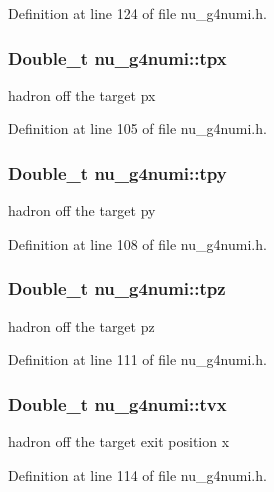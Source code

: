 Definition at line 124 of file nu\-\_\-g4numi.\-h.

\hypertarget{classnu__g4numi_a8693b10daf61759ad2decb2c3aac6a9e}{
\subsubsection[{tpx}]{\setlength{\rightskip}{0pt plus 5cm}Double\-\_\-t nu\-\_\-g4numi\-::tpx}}\label{classnu__g4numi_a8693b10daf61759ad2decb2c3aac6a9e}
hadron off the target px 

Definition at line 105 of file nu\-\_\-g4numi.\-h.

\hypertarget{classnu__g4numi_a533f9a7e3002a702856c25dd1e5c7058}{
\subsubsection[{tpy}]{\setlength{\rightskip}{0pt plus 5cm}Double\-\_\-t nu\-\_\-g4numi\-::tpy}}\label{classnu__g4numi_a533f9a7e3002a702856c25dd1e5c7058}
hadron off the target py 

Definition at line 108 of file nu\-\_\-g4numi.\-h.

\hypertarget{classnu__g4numi_a63eb35fe1697f426543e34652202e30b}{
\subsubsection[{tpz}]{\setlength{\rightskip}{0pt plus 5cm}Double\-\_\-t nu\-\_\-g4numi\-::tpz}}\label{classnu__g4numi_a63eb35fe1697f426543e34652202e30b}
hadron off the target pz 

Definition at line 111 of file nu\-\_\-g4numi.\-h.

\hypertarget{classnu__g4numi_a8675345bdaaec6f0d4ff5f57571133a0}{
\subsubsection[{tvx}]{\setlength{\rightskip}{0pt plus 5cm}Double\-\_\-t nu\-\_\-g4numi\-::tvx}}\label{classnu__g4numi_a8675345bdaaec6f0d4ff5f57571133a0}
hadron off the target exit position x 

Definition at line 114 of file nu\-\_\-g4numi.\-h.

